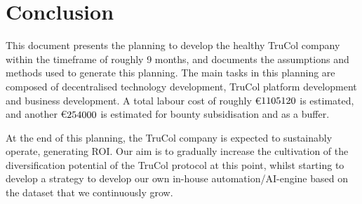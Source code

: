 \section{Conclusion}\label{sec:conclusion}
This document presents the planning to develop the healthy TruCol company within the timeframe of roughly 9 months, and documents the assumptions and methods used to generate this planning. The main tasks in this planning are composed of decentralised technology development, TruCol platform development and business development. A total labour cost of roughly \euro$1105120$ is estimated, and another \euro$254000$ is estimated for bounty subsidisation and as a buffer.

At the end of this planning, the TruCol company is expected to sustainably operate, generating ROI. Our aim is to gradually increase the cultivation of the diversification potential of the TruCol protocol at this point, whilst starting to develop a strategy to develop our own in-house automation/AI-engine based on the dataset that we continuously grow.
